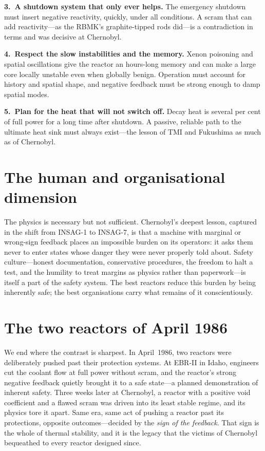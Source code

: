 \textbf{3.\ A shutdown system that only ever helps.} The emergency shutdown must
insert negative reactivity, quickly, under all conditions. A scram that can add
reactivity---as the RBMK's graphite-tipped rods did---is a contradiction in terms
and was decisive at Chernobyl.

\textbf{4.\ Respect the slow instabilities and the memory.} Xenon poisoning and
spatial oscillations give the reactor an hours-long memory and can make a large
core locally unstable even when globally benign. Operation must account for
history and spatial shape, and negative feedback must be strong enough to damp
spatial modes.

\textbf{5.\ Plan for the heat that will not switch off.} Decay heat is several per
cent of full power for a long time after shutdown. A passive, reliable path to the
ultimate heat sink must always exist---the lesson of TMI and Fukushima as much as
of Chernobyl.

\section{The human and organisational dimension}

The physics is necessary but not sufficient. Chernobyl's deepest lesson, captured
in the shift from INSAG-1 to INSAG-7, is that a machine with marginal or wrong-sign
feedback places an impossible burden on its operators: it asks them never to enter
states whose danger they were never properly told about. Safety culture---honest
documentation, conservative procedures, the freedom to halt a test, and the
humility to treat margins as physics rather than paperwork---is itself a part of
the safety system. The best reactors reduce this burden by being inherently safe;
the best organisations carry what remains of it conscientiously.

\section{The two reactors of April 1986}

We end where the contrast is sharpest. In April~1986, two reactors were
deliberately pushed past their protection systems. At EBR-II in Idaho, engineers
cut the coolant flow at full power without scram, and the reactor's strong negative
feedback quietly brought it to a safe state---a planned demonstration of inherent
safety. Three weeks later at Chernobyl, a reactor with a positive void coefficient
and a flawed scram was driven into its least stable regime, and its physics tore it
apart. Same era, same act of pushing a reactor past its protections, opposite
outcomes---decided by the \emph{sign of the feedback}. That sign is the whole of
thermal stability, and it is the legacy that the victims of Chernobyl bequeathed to
every reactor designed since.

